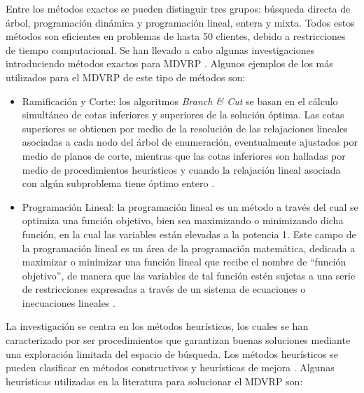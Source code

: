 Entre los métodos exactos se pueden distinguir tres grupos: búsqueda directa de árbol, programación dinámica y programación lineal, entera y mixta. Todos estos métodos son eficientes en problemas de hasta 50 clientes, debido a restricciones de tiempo computacional. Se han llevado a cabo algunas investigaciones introduciendo métodos exactos para MDVRP  \parencite{colinDisenoAlgoritmoMetaheuristico2024}. Algunos ejemplos de los más utilizados para el MDVRP de este tipo de métodos son:

\begin{itemize}
  \item Ramificación y Corte: los algoritmos \textit{Branch \& Cut} se basan en el cálculo simultáneo de cotas inferiores y superiores de la solución óptima. Las cotas superiores se obtienen por medio de la resolución de las relajaciones lineales asociadas a cada nodo del árbol de enumeración, eventualmente ajustados por medio de planos de corte, mientras que las cotas inferiores son halladas por medio de procedimientos heurísticos y cuando la relajación lineal asociada con algún subproblema tiene óptimo entero  \parencite{hernandezAPLICACIONMODELOVRP2015}.
  \item Programación Lineal: la programación lineal es un método a través del cual se optimiza una función objetivo, bien sea maximizando o minimizando dicha función, en la cual las variables están elevadas a la potencia 1. Este campo de la programación lineal es un área de la programación matemática, dedicada a maximizar o minimizar una función lineal que recibe el nombre de ``función objetivo'', de manera que las variables de tal función estén sujetas a una serie de restricciones expresadas a través de un sistema de ecuaciones o inecuaciones lineales \parencite{colinDisenoAlgoritmoMetaheuristico2024}.
\end{itemize}

La investigación se centra en los métodos heurísticos, los cuales se han caracterizado por ser procedimientos que garantizan buenas soluciones mediante una exploración limitada del espacio de búsqueda. Los métodos heurísticos se pueden clasificar en métodos constructivos y heurísticas de mejora \parencite{colinDisenoAlgoritmoMetaheuristico2024}. Algunas heurísticas utilizadas en la literatura para solucionar el MDVRP son:

